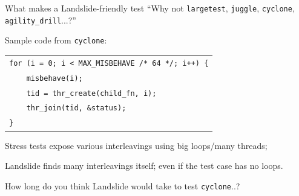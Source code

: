 \documentclass[xcolor=dvipsnames]{beamer}
\begin{document}
\begin{frame}{What makes a Landslide-friendly test}
	``Why not {\tt largetest}, {\tt juggle}, {\tt cyclone}, {\tt agility\_drill}...?''
	\linegap

	Sample code from {\tt cyclone}: %
	\begin{center}
	\begin{tabular}{l}
		\texttt{for (i = 0; i < MAX\_MISBEHAVE /* 64 */; i++) \{} \\
		\texttt{~~~~misbehave(i);} \\
		\texttt{~~~~tid = thr\_create(child\_fn, i);} \\
		\texttt{~~~~thr\_join(tid, \&status);} \\
		\texttt{\}}
	\end{tabular}
	\end{center}
	\pause
	\linegap

	Stress tests expose various interleavings using big loops/many threads;
	\linegap

	Landslide finds many interleavings itself; even if the test case has no loops.
	\vspace{0.01in}

	How long do you think Landslide would take to test {\tt cyclone}..?
\end{frame}

%
%
%
\end{document}
